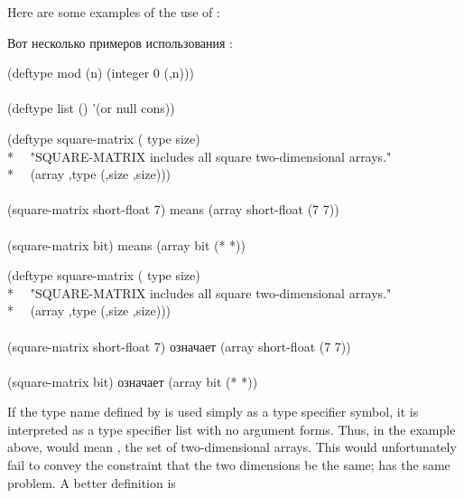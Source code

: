 \begin{defmac}
Here are some examples of the use of :

Вот несколько примеров использования :
\begin{lisp}
(deftype mod (n) {\Xbq}(integer 0 (,n))) \\
 \\
(deftype list () '(or null cons))
\end{lisp}


\begin{lisp}
(deftype square-matrix ( type size) \\*
~~"SQUARE-MATRIX includes all square two-dimensional arrays." \\*
~~{\Xbq}(array ,type (,size ,size))) \\
 \\
(square-matrix short-float 7)  \textrm{means}  (array short-float (7 7)) \\
 \\
(square-matrix bit)  \textrm{means}  (array bit (* *))
\end{lisp}

\begin{lisp}
(deftype square-matrix ( type size) \\*
~~"SQUARE-MATRIX includes all square two-dimensional arrays." \\*
~~{\Xbq}(array ,type (,size ,size))) \\
 \\
(square-matrix short-float 7)  \textrm{означает}  (array short-float (7 7)) \\
 \\
(square-matrix bit)  \textrm{означает}  (array bit (* *))
\end{lisp}
If the type name defined by  is used simply as a type
specifier symbol, it is interpreted as a type specifier list with
no argument forms.  Thus, in the example above, 
would mean , the set of two-dimensional arrays.
This would unfortunately fail to convey the constraint that the two
dimensions be the same;  has the same problem.
A better definition is


\end{defmac}
